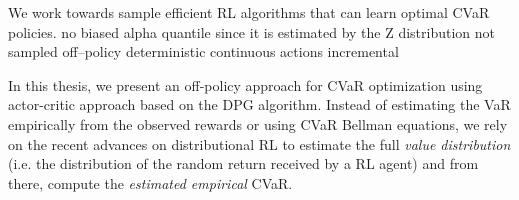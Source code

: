 We work towards sample efficient RL algorithms that can learn optimal CVaR policies.
no biased alpha quantile since it is estimated by the Z distribution not sampled
off--policy
deterministic
continuous actions
incremental


In this thesis, we present an off-policy approach for CVaR optimization using actor-critic approach based on the DPG algorithm.
Instead of estimating the VaR empirically from the observed rewards or using CVaR Bellman equations,
we rely on the recent advances on distributional RL  \citep{Bellemare2017,Dabney2018a,Dabney2018b} to estimate the full
\textit{value distribution} (i.e. the distribution of the random return received by a RL agent) and from there, compute the
 \textit{estimated empirical} CVaR.






